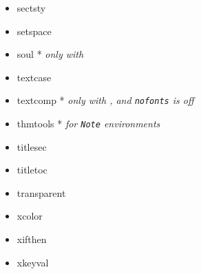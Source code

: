 \documentclass[a4paper]{tufte-book}
\begin{document}
\begin{multicols}{2}
\begin{itemize}
    \item sectsty
    \item setspace
    \item soul * \textit{only with }
    \item textcase
    \item textcomp * \textit{only with , and \texttt{nofonts} is off}
    \item thmtools * \textit{for \texttt{Note} environments}
    \item titlesec
    \item titletoc
    \item transparent
    \item xcolor
    \item xifthen
    \item xkeyval
  \end{itemize}
\end{multicols}


\backmatter{}

\printbibliography{}

\printindex{}
\end{document}
